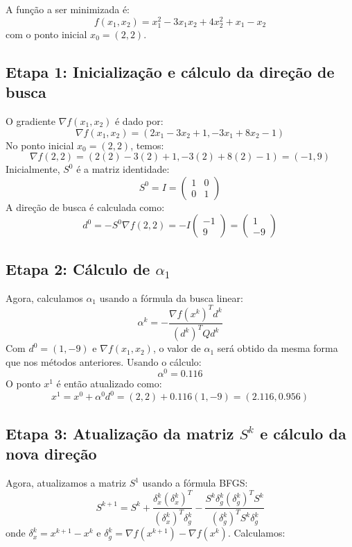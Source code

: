\documentclass[a4paper, 12pt]{article}
\begin{document}
A função a ser minimizada é:
\[
f(x_1, x_2) = x_1^2 - 3x_1x_2 + 4x_2^2 + x_1 - x_2
\]
com o ponto inicial \( x_0 = (2, 2) \).

\subsection{Etapa 1: Inicialização e cálculo da direção de busca}
O gradiente \( \nabla f(x_1, x_2) \) é dado por:
\[
\nabla f(x_1, x_2) = \left( 2x_1 - 3x_2 + 1, -3x_1 + 8x_2 - 1 \right)
\]
No ponto inicial \( x_0 = (2, 2) \), temos:
\[
\nabla f(2, 2) = \left( 2(2) - 3(2) + 1, -3(2) + 8(2) - 1 \right) = (-1, 9)
\]
Inicialmente, \( S^0 \) é a matriz identidade:
\[
S^0 = I = \begin{pmatrix} 1 & 0 \\ 0 & 1 \end{pmatrix}
\]
A direção de busca é calculada como:
\[
d^0 = -S^0 \nabla f(2, 2) = -I \begin{pmatrix} -1 \\ 9 \end{pmatrix} = \begin{pmatrix} 1 \\ -9 \end{pmatrix}
\]

\subsection{Etapa 2: Cálculo de \( \alpha_1 \)}
Agora, calculamos \( \alpha_1 \) usando a fórmula da busca linear:
\[
\alpha^k = -\frac{\nabla f(x^k)^T d^k}{(d^k)^T Q d^k}
\]
Com \( d^0 = (1, -9) \) e \( \nabla f(x_1, x_2) \), o valor de \( \alpha_1 \) será obtido da mesma forma que nos métodos anteriores. Usando o cálculo:
\[
\alpha^0 = 0.116
\]
O ponto \( x^1 \) é então atualizado como:
\[
x^1 = x^0 + \alpha^0 d^0 = (2, 2) + 0.116(1, -9) = (2.116, 0.956)
\]

\subsection{Etapa 3: Atualização da matriz \( S^k \) e cálculo da nova direção}
Agora, atualizamos a matriz \( S^1 \) usando a fórmula BFGS:
\[
S^{k+1} = S^k + \frac{\delta_x^k (\delta_x^k)^T}{(\delta_x^k)^T \delta_g^k} - \frac{S^k \delta_g^k (\delta_g^k)^T S^k}{(\delta_g^k)^T S^k \delta_g^k}
\]
onde \( \delta_x^k = x^{k+1} - x^k \) e \( \delta_g^k = \nabla f(x^{k+1}) - \nabla f(x^k) \). Calculamos:
\end{document}

